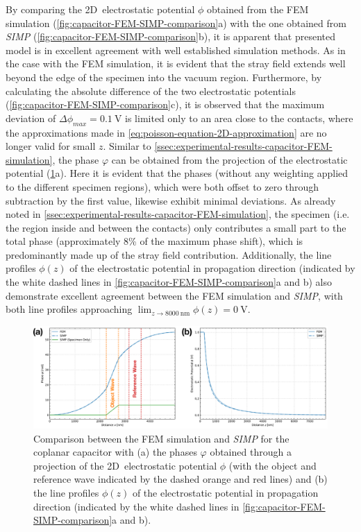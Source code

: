 By comparing the 2D~electrostatic potential $\phi$ obtained from the FEM simulation (\cref{fig:capacitor-FEM-SIMP-comparison}a) with the one obtained from \emph{SIMP} (\cref{fig:capacitor-FEM-SIMP-comparison}b), it is apparent that presented model is in excellent agreement with well established simulation methods. As in the case with the FEM simulation, it is evident that the stray field extends well beyond the edge of the specimen into the vacuum region. Furthermore, by calculating the absolute difference of the two electrostatic potentials (\cref{fig:capacitor-FEM-SIMP-comparison}c), it is observed that the maximum deviation of $\Delta \phi_{\mathit{max}} = \SI{0.1}{\volt}$ is limited only to an area close to the contacts, where the approximations made in \cref{eq:poisson-equation-2D-approximation} are no longer valid for small $z$.
\newpage
Similar to \cref{ssec:experimental-results-capacitor-FEM-simulation}, the phase $\varphi$ can be obtained from the projection of the electrostatic potential (\cref{fig:capacitor-FEM-SIMP-linescan-comparison}a). Here it is evident that the phases (without any weighting applied to the different specimen regions), which were both offset to zero through subtraction by the first value, likewise exhibit minimal deviations. As already noted in \cref{ssec:experimental-results-capacitor-FEM-simulation}, the specimen (i.e. the region inside and between the contacts) only contributes a small part to the total phase (approximately 8\% of the maximum phase shift), which is predominantly made up of the stray field contribution. Additionally, the line profiles $\phi\left(z\right)$ of the electrostatic potential in propagation direction (indicated by the white dashed lines in \cref{fig:capacitor-FEM-SIMP-comparison}a and b) also demonstrate excellent agreement between the FEM simulation and \emph{SIMP}, with both line profiles approaching $\lim_{z\to\SI{8000}{\nm}} \phi\left(z\right) = \SI{0}{\volt}$.
\begin{figure}[H]
	\centering
	\includegraphics[width=\textwidth]{Figures/Results/Capacitor/Simulations/capacitor-FEM-SIMP-linescan-comparison.pdf}
	\caption{Comparison between the FEM simulation and \emph{SIMP} for the coplanar capacitor with (a) the phases $\varphi$ obtained through a projection of the 2D~electrostatic potential $\phi$ (with the object and reference wave indicated by the dashed orange and red lines) and (b) the line profiles $\phi\left(z\right)$ of the electrostatic potential in propagation direction (indicated by the white dashed lines in \cref{fig:capacitor-FEM-SIMP-comparison}a and b).}
	\label{fig:capacitor-FEM-SIMP-linescan-comparison}
\end{figure}
